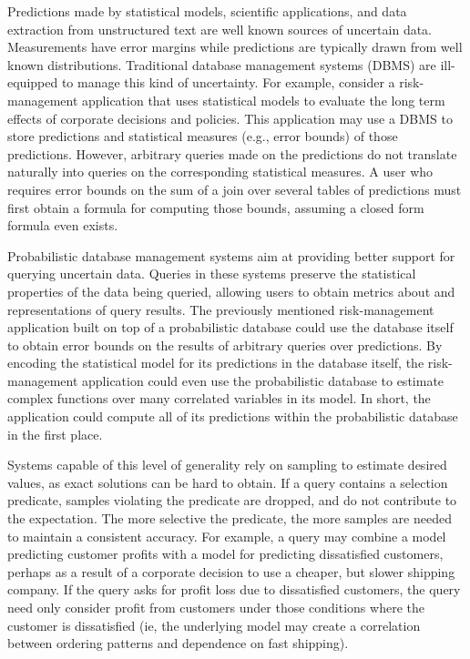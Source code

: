 Predictions made by statistical models, scientific applications, and data extraction from unstructured text are well known sources of uncertain data.  Measurements have error margins while predictions are typically drawn from well known distributions.  Traditional database management systems (DBMS) are ill-equipped to manage this kind of uncertainty.  For example, consider a risk-management application that uses statistical models to evaluate the long term effects of corporate decisions and policies.  This application may use a DBMS to store predictions and statistical measures (e.g., error bounds) of those predictions.  However, arbitrary queries made on the predictions do not translate naturally into queries on the corresponding statistical measures.  A user who requires error bounds on the sum of a join over several tables of predictions must first obtain a formula for computing those bounds, assuming a closed form formula even exists.

Probabilistic  database  management  systems \cite{dalvi07efficient, WidomTrio2008, KochMayBMS2008, SD2007, ORION, MCDB, BayesStore} aim at providing better support for querying uncertain data.  Queries in these systems preserve the statistical properties of the data being queried, allowing users to obtain metrics about and representations of query results.  The previously mentioned risk-management application built on top of a probabilistic database could use the database itself to obtain error bounds on the results of arbitrary queries over predictions.  By encoding the statistical model for its predictions in the database itself, the risk-management application could even use the probabilistic database to estimate complex functions over many correlated variables in its model.  In short, the application could compute all of its predictions within the probabilistic database in the first place.

Systems capable of this level of generality rely on sampling to estimate desired values, as exact solutions can be hard to obtain.  If a query contains a selection predicate, samples violating the predicate are dropped, and do not contribute to the expectation.  The more selective the predicate, the more samples are needed to maintain a consistent accuracy.  For example, a query may combine a model predicting customer profits with a model for predicting dissatisfied customers, perhaps as a result of a corporate decision to use a cheaper, but slower shipping company.  If the query asks for profit loss due to dissatisfied customers, the query need only consider profit from customers under those conditions where the customer is dissatisfied (ie, the underlying model may create a correlation between ordering patterns and dependence on fast shipping).  

